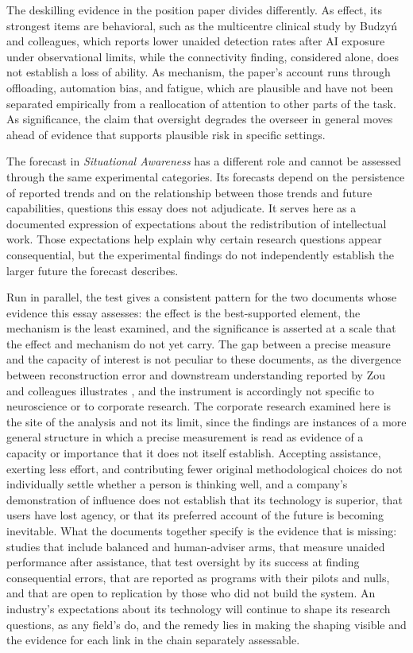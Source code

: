 \documentclass[11pt]{article}
\begin{document}
The deskilling evidence in the position paper divides differently. As effect, its strongest items are behavioral, such as the multicentre clinical study by Budzyń and colleagues, which reports lower unaided detection rates after AI exposure under observational limits, while the connectivity finding, considered alone, does not establish a loss of ability. As mechanism, the paper's account runs through offloading, automation bias, and fatigue, which are plausible and have not been separated empirically from a reallocation of attention to other parts of the task. As significance, the claim that oversight degrades the overseer in general moves ahead of evidence that supports plausible risk in specific settings.

The forecast in \emph{Situational Awareness} has a different role and cannot be assessed through the same experimental categories. Its forecasts depend on the persistence of reported trends and on the relationship between those trends and future capabilities, questions this essay does not adjudicate. It serves here as a documented expression of expectations about the redistribution of intellectual work. Those expectations help explain why certain research questions appear consequential, but the experimental findings do not independently establish the larger future the forecast describes.

Run in parallel, the test gives a consistent pattern for the two documents whose evidence this essay assesses: the effect is the best-supported element, the mechanism is the least examined, and the significance is asserted at a scale that the effect and mechanism do not yet carry. The gap between a precise measure and the capacity of interest is not peculiar to these documents, as the divergence between reconstruction error and downstream understanding reported by Zou and colleagues illustrates \cite{zou}, and the instrument is accordingly not specific to neuroscience or to corporate research. The corporate research examined here is the site of the analysis and not its limit, since the findings are instances of a more general structure in which a precise measurement is read as evidence of a capacity or importance that it does not itself establish. Accepting assistance, exerting less effort, and contributing fewer original methodological choices do not individually settle whether a person is thinking well, and a company's demonstration of influence does not establish that its technology is superior, that users have lost agency, or that its preferred account of the future is becoming inevitable. What the documents together specify is the evidence that is missing: studies that include balanced and human-adviser arms, that measure unaided performance after assistance, that test oversight by its success at finding consequential errors, that are reported as programs with their pilots and nulls, and that are open to replication by those who did not build the system. An industry's expectations about its technology will continue to shape its research questions, as any field's do, and the remedy lies in making the shaping visible and the evidence for each link in the chain separately assessable.
\end{document}
